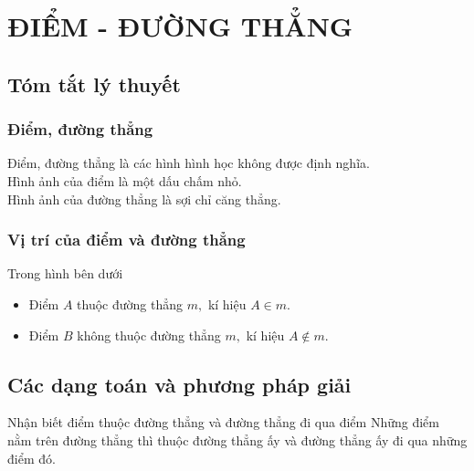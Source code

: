 \section{ĐIỂM - ĐƯỜNG THẲNG}
\subsection{Tóm tắt lý thuyết}
\subsubsection{Điểm, đường thẳng}
Điểm, đường thẳng là các hình hình học không được định nghĩa.\\
Hình ảnh của điểm là một dấu chấm nhỏ.\\
Hình ảnh của đường thẳng là sợi chỉ căng thẳng.
\subsubsection{Vị trí của điểm và đường thẳng}
Trong hình bên dưới
\begin{center}
\end{center}
\begin{itemize}
\item Điểm $A$ thuộc đường thẳng $m,$ kí hiệu $A \in m.$
\item Điểm $B$ không thuộc đường thẳng $m,$ kí hiệu $A \notin m.$
\end{itemize}
\subsection{Các dạng toán và phương pháp giải}
\begin{dang}{Nhận biết điểm thuộc đường thẳng và đường thẳng đi qua điểm}
Những điểm nằm trên đường thẳng thì thuộc đường thẳng ấy và đường thẳng ấy đi qua những điểm đó.
\end{dang}

